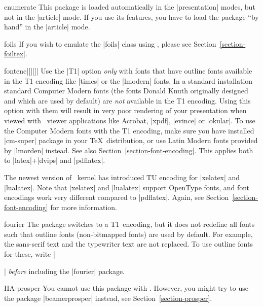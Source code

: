 \begin{package}{{enumerate}}
  \articlenote
  This package is loaded automatically in the |presentation| modes, but not in the |article| mode. If you use its features, you have to load the package ``by hand'' in the |article| mode.
\end{package}

\begin{class}{{foils}}
  If you wish to emulate the |foils| class using \beamer, please see Section~\ref{section-foiltex}.
\end{class}

\begin{package}{{fontenc}|[||]|}
  Use the |T1| option \emph{only} with fonts that have outline fonts available in the T1 encoding like |times| or the |lmodern| fonts. In a standard installation standard Computer Modern fonts (the fonts Donald Knuth originally designed and which are used by default) are \emph{not} available in the T1 encoding. Using this option with them will result in very poor rendering of your presentation when viewed with \pdf\ viewer applications like Acrobat, |xpdf|, |evince| or |okular|. To use the Computer Modern fonts with the T1 encoding, make sure you have installed |cm-super| package in your \TeX\ distribution, or use Latin Modern fonts provided by |lmorden| instead. See also Section~\ref{section-font-encoding}. This applies both to |latex|+|dvips| and |pdflatex|.

  The newest version of \LaTeXe\ kernel has introduced TU encoding for |xelatex| and |lualatex|. Note that |xelatex| and |lualatex| support OpenType fonts, and font encodings work very different compared to |pdflatex|. Again, see Section~\ref{section-font-encoding} for more information.
\end{package}

\begin{package}{{fourier}}
  The package switches to a T1~encoding, but it does not redefine all fonts such that outline fonts (non-bitmapped fonts) are used by default. For example, the sans-serif text and the typewriter text are not replaced. To use outline fonts for these, write |\usepackage{lmodern}| \emph{before} including the |fourier| package.
\end{package}

\begin{package}{{HA-prosper}}
  You cannot use this package with \beamer. However, you might try to use the package |beamerprosper| instead, see Section~\ref{section-prosper}.
\end{package}

